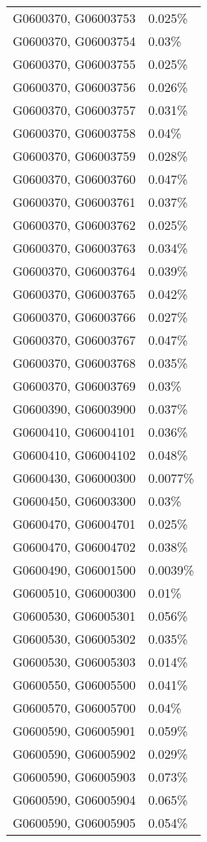 \begin{longtable}[]{@{}ll@{}}
G0600370, G06003753 & 0.025\% \\
G0600370, G06003754 & 0.03\% \\
G0600370, G06003755 & 0.025\% \\
G0600370, G06003756 & 0.026\% \\
G0600370, G06003757 & 0.031\% \\
G0600370, G06003758 & 0.04\% \\
G0600370, G06003759 & 0.028\% \\
G0600370, G06003760 & 0.047\% \\
G0600370, G06003761 & 0.037\% \\
G0600370, G06003762 & 0.025\% \\
G0600370, G06003763 & 0.034\% \\
G0600370, G06003764 & 0.039\% \\
G0600370, G06003765 & 0.042\% \\
G0600370, G06003766 & 0.027\% \\
G0600370, G06003767 & 0.047\% \\
G0600370, G06003768 & 0.035\% \\
G0600370, G06003769 & 0.03\% \\
G0600390, G06003900 & 0.037\% \\
G0600410, G06004101 & 0.036\% \\
G0600410, G06004102 & 0.048\% \\
G0600430, G06000300 & 0.0077\% \\
G0600450, G06003300 & 0.03\% \\
G0600470, G06004701 & 0.025\% \\
G0600470, G06004702 & 0.038\% \\
G0600490, G06001500 & 0.0039\% \\
G0600510, G06000300 & 0.01\% \\
G0600530, G06005301 & 0.056\% \\
G0600530, G06005302 & 0.035\% \\
G0600530, G06005303 & 0.014\% \\
G0600550, G06005500 & 0.041\% \\
G0600570, G06005700 & 0.04\% \\
G0600590, G06005901 & 0.059\% \\
G0600590, G06005902 & 0.029\% \\
G0600590, G06005903 & 0.073\% \\
G0600590, G06005904 & 0.065\% \\
G0600590, G06005905 & 0.054\% \\

\end{longtable}
